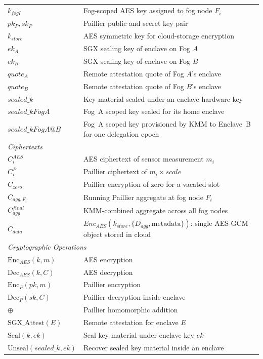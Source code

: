 \documentclass[conference]{IEEEtran}
\begin{document}
\begin{table}[htbp]
{\begin{tabular}{ll}
    $k_{fogI}$ & Fog-scoped AES key assigned to fog node $F_i$ \\
    $pk_P, sk_P$ & Paillier public and secret key pair \\
    $k_{store}$ & AES symmetric key for cloud-storage encryption \\
    $ek_A$ & SGX sealing key of enclave on Fog $A$ \\
    $ek_B$ & SGX sealing key of enclave on Fog $B$ \\
    $quote_A$ & Remote attestation quote of Fog $A$'s enclave \\
    $quote_B$ & Remote attestation quote of Fog $B$'s enclave \\
    $sealed\_k$ & Key material sealed under an enclave hardware key \\
    $sealed\_kFogA$ & Fog~A scoped key sealed for its home enclave \\
    $sealed\_kFogA@B$ & Fog~A scoped key provisioned by KMM to Enclave~B for one delegation epoch \\

    \multicolumn{2}{l}{\textit{Ciphertexts}} \\

    $C_i^{AES}$ & AES ciphertext of sensor measurement $m_i$ \\
    $C_i^P$ & Paillier ciphertext of $m_i \times scale$ \\
    $C_{zero}$ & Paillier encryption of zero for a vacated slot \\
    $C_{agg,F_i}$ & Running Paillier aggregate at fog node $F_i$ \\
    $C_{agg}^{final}$ & KMM-combined aggregate across all fog nodes \\
    $C_{data}$ & $Enc_{AES}(k_{store}, \{D_{agg}, \mathrm{metadata}\})$: single AES-GCM object stored in cloud \\

    \multicolumn{2}{l}{\textit{Cryptographic Operations}} \\

    $\text{Enc}_{AES}(k,m)$ & AES encryption \\
    $\text{Dec}_{AES}(k,C)$ & AES decryption \\
    $\text{Enc}_{P}(pk,m)$ & Paillier encryption \\
    $\text{Dec}_{P}(sk,C)$ & Paillier decryption inside enclave \\
    $\oplus$ & Paillier homomorphic addition \\
    $\text{SGX\_Attest}(E)$ & Remote attestation for enclave $E$ \\
    $\text{Seal}(k,ek)$ & Seal key material under enclave key $ek$ \\
    $\text{Unseal}(sealed\_k,ek)$ & Recover sealed key material inside an enclave \\

    \hline
    \end{tabular}
    }
    \end{table}
\end{document}
